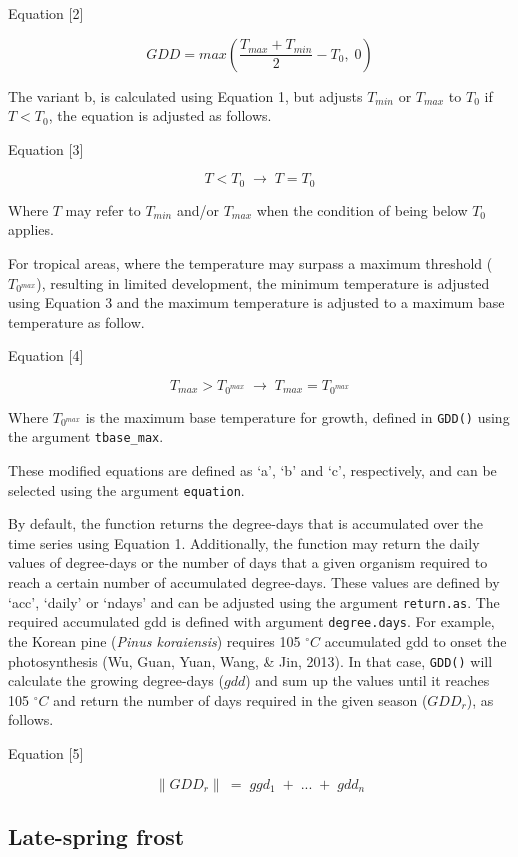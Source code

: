 \documentclass[
]{article}
\begin{document}
Equation {[}2{]}

\[ GDD = max \left(\frac{T_{max} + T_{min}}{2} - T_{0}, \; 0 \right)\]

The variant b, is calculated using Equation 1, but adjusts \(T_{min}\)
or \(T_{max}\) to \(T_{0}\) if \(T < T_{0}\), the equation is adjusted
as follows.

Equation {[}3{]}

\[ T < T_{0} \; \rightarrow \; T = T_{0} \]

Where \(T\) may refer to \(T_{min}\) and/or \(T_{max}\) when the
condition of being below \(T_{0}\) applies.

For tropical areas, where the temperature may surpass a maximum
threshold (\(T_{0^{max}}\)), resulting in limited development, the
minimum temperature is adjusted using Equation 3 and the maximum
temperature is adjusted to a maximum base temperature as follow.

Equation {[}4{]}

\[ T_{max} > T_{0^{max}} \; \rightarrow \; T_{max} = T_{0^{max}} \]

Where \(T_{0^{max}}\) is the maximum base temperature for growth,
defined in \texttt{GDD()} using the argument \texttt{tbase\_max}.

These modified equations are defined as `a', `b' and `c', respectively,
and can be selected using the argument \texttt{equation}.

By default, the function returns the degree-days that is accumulated
over the time series using Equation 1. Additionally, the function may
return the daily values of degree-days or the number of days that a
given organism required to reach a certain number of accumulated
degree-days. These values are defined by `acc', `daily' or `ndays' and
can be adjusted using the argument \texttt{return.as}. The required
accumulated gdd is defined with argument \texttt{degree.days}. For
example, the Korean pine (\emph{Pinus koraiensis}) requires 105
\(^\circ C\) accumulated gdd to onset the photosynthesis (Wu, Guan,
Yuan, Wang, \& Jin, 2013). In that case, \texttt{GDD()} will calculate
the growing degree-days (\(gdd\)) and sum up the values until it reaches
105 \(^\circ C\) and return the number of days required in the given
season (\(GDD_{r}\)), as follows.

Equation {[}5{]}

\[\parallel GDD_{r} \parallel \: = \; ggd_1 \;+ \; ...  \; +  \; gdd_n\]

\hypertarget{late-spring-frost}{%
\subsection{Late-spring frost}\label{late-spring-frost}}
\end{document}
